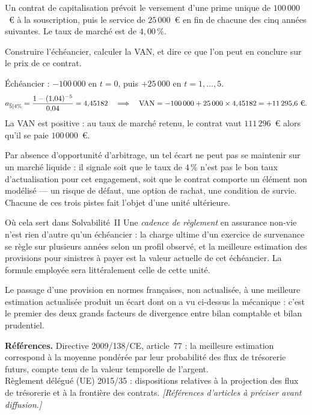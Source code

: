 \begin{exercice}
Un contrat de capitalisation prévoit le versement d'une prime unique de
$100\,000$~\euro{} à la souscription, puis le service de $25\,000$~\euro{} en fin
de chacune des cinq années suivantes. Le taux de marché est de $4{,}00\,\%$.

Construire l'échéancier, calculer la VAN, et dire ce que l'on peut en conclure
sur le prix de ce contrat.
\end{exercice}

\begin{corrige}
Échéancier : $-100\,000$ en $t=0$, puis $+25\,000$ en $t=1,\dots,5$.
\[
  a_{\overline{5}|4\%} = \frac{1-(1{,}04)^{-5}}{0{,}04} = 4{,}45182
  \quad\Longrightarrow\quad
  \mathrm{VAN} = -100\,000 + 25\,000 \times 4{,}45182 = +11\,295{,}6\ \text{\euro}.
\]
La VAN est positive : au taux de marché retenu, le contrat vaut $111\,296$~\euro{}
alors qu'il se paie $100\,000$~\euro.

Par absence d'opportunité d'arbitrage, un tel écart ne peut pas se maintenir sur
un marché liquide : il signale soit que le taux de $4\,\%$ n'est pas le bon taux
d'actualisation pour cet engagement, soit que le contrat comporte un élément non
modélisé --- un risque de défaut, une option de rachat, une condition de survie.
Chacune de ces trois pistes fait l'objet d'une unité ultérieure.
\end{corrige}

\begin{pont}{Où cela sert dans Solvabilité~II}
Une \emph{cadence de règlement} en assurance non-vie n'est rien d'autre qu'un
échéancier : la charge ultime d'un exercice de survenance se règle sur plusieurs
années selon un profil observé, et la meilleure estimation des provisions pour
sinistres à payer est la valeur actuelle de cet échéancier. La formule employée
sera littéralement celle de cette unité.

Le passage d'une provision en normes françaises, non actualisée, à une meilleure
estimation actualisée produit un écart dont on a vu ci-dessus la mécanique :
c'est le premier des deux grands facteurs de divergence entre bilan comptable et
bilan prudentiel.
\end{pont}

\begin{refreg}
\textbf{Références.} Directive 2009/138/CE, article~77 : la meilleure estimation
correspond à la moyenne pondérée par leur probabilité des flux de trésorerie
futurs, compte tenu de la valeur temporelle de l'argent. \\
Règlement délégué (UE) 2015/35 : dispositions relatives à la projection des flux
de trésorerie et à la frontière des contrats. \emph{[Références d'articles à
préciser avant diffusion.]}
\end{refreg}

